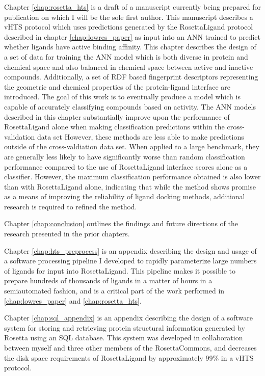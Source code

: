 Chapter \ref{chap:rosetta_hts} is a draft of a manuscript currently being prepared for publication on which I will be the sole first author.
This manuscript describes a \ac{vHTS} protocol which uses predictions generated by the RosettaLigand protocol described in chapter \ref{chap:lowres_paper} as input into an \ac{ANN} trained to predict whether ligands have active binding affinity.
This chapter describes the design of a set of data for training the \ac{ANN} model which is both diverse in protein and chemical space and also balanced in chemical space between active and inactive compounds.
Additionally, a set of \ac{RDF} based fingerprint descriptors representing the geometric and chemical properties of the protein-ligand interface are introduced.
The goal of this work is to eventually produce a model which is capable of accurately classifying compounds based on activity.
The \ac{ANN} models described in this chapter substantially improve upon the performance of RosettaLigand alone when making classification predictions within the cross-validation data set
However, these methods are less able to make predictions outside of the cross-valdiation data set.  When applied to a large benchmark, they are generally less likely to have significantly worse than random classification performance compared to the use of RosettaLigand interface scores alone as a classifier.
However, the maximum classification performance obtained is also lower than with RosettaLigand alone, indicating that while the method shows promise as a means of improving the reliability of ligand docking methods, additional research is required to refined the method.

Chapter \ref{chap:conclusion} outlines the findings and future directions of the research presented in the prior chapters.

Chapter \ref{chap:hts_preprocess} is an appendix describing the design and usage of a software processing pipeline I developed to rapidly parameterize large numbers of ligands for input into RosettaLigand.
This pipeline makes it possible to prepare hundreds of thousands of ligands in a matter of hours in a semiautomated fashion, and is a critical part of the work performed in \ref{chap:lowres_paper} and \ref{chap:rosetta_hts}.

Chapter \ref{chap:sql_appendix} is an appendix describing the design of a software system for storing and retrieving protein structural information generated by Rosetta using an \ac{SQL} database.
This system was developed in collaboration between myself and three other members of the RosettaCommons, and decreases the disk space requirements of RosettaLigand by approximately 99\% in a \ac{vHTS} protocol.


